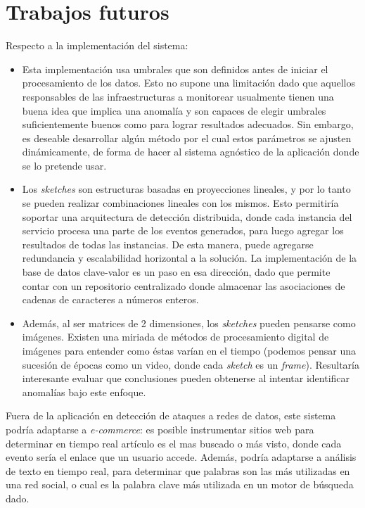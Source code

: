 \documentclass[a4paper,12pt, oneside]{article}
\begin{document}
\section{Trabajos futuros} \label{sec:trabajos_futuros}
Respecto a la implementación del sistema:
\begin{itemize}
	\item Esta implementación usa umbrales que son definidos antes de iniciar el procesamiento de los datos. Esto no supone una limitación dado que aquellos responsables de las infraestructuras a monitorear usualmente tienen una buena idea que implica una anomalía y son capaces de elegir umbrales suficientemente buenos como para lograr resultados adecuados. Sin embargo, es deseable desarrollar algún método por el cual estos parámetros se ajusten dinámicamente, de forma de hacer al sistema agnóstico de la aplicación donde se lo pretende usar.
	\item Los \textit{sketches} son estructuras basadas en proyecciones lineales, y por lo tanto se pueden realizar combinaciones lineales con los mismos. Esto permitiría soportar una arquitectura de detección distribuida, donde cada instancia del servicio procesa una parte de los eventos generados, para luego agregar los resultados de todas las instancias. De esta manera, puede agregarse redundancia y escalabilidad horizontal a la solución. La implementación de la base de datos clave-valor es un paso en esa dirección, dado que permite contar con un repositorio centralizado donde almacenar las asociaciones de cadenas de caracteres a números enteros.
	\item Además, al ser matrices de 2 dimensiones, los \textit{sketches} pueden pensarse como imágenes. Existen una miriada de métodos de procesamiento digital de imágenes para entender como éstas varían en el tiempo (podemos pensar una sucesión de épocas como un video, donde cada \textit{sketch} es un \textit{frame}). Resultaría interesante evaluar que conclusiones pueden obtenerse al intentar identificar anomalías bajo este enfoque.
\end{itemize}

Fuera de la aplicación en detección de ataques a redes de datos, este sistema podría adaptarse a \textit{e-commerce}: es posible instrumentar sitios web para determinar en tiempo real artículo es el mas buscado o más visto, donde cada evento sería el enlace que un usuario accede. Además, podría adaptarse a análisis de texto en tiempo real, para determinar que palabras son las más utilizadas en una red social, o cual es la palabra clave más utilizada en un motor de búsqueda dado.
\end{document}
